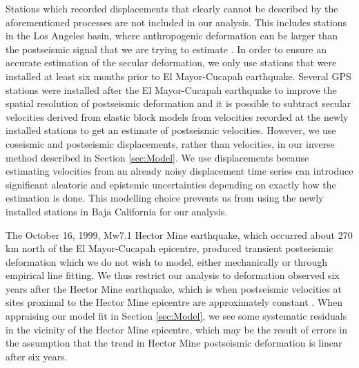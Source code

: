\documentclass[review]{elsarticle}
\begin{document}
Stations which recorded displacements that clearly cannot be described by the aforementioned processes are not included in our analysis. This includes stations in the Los Angeles basin, where anthropogenic deformation can be larger than the postseismic signal that we are trying to estimate \citep{Bawden2001,Argus2005} . In order to ensure an accurate estimation of the secular deformation, we only use stations that were installed at least six months prior to El Mayor-Cucapah earthquake. Several GPS stations were installed after the El Mayor-Cucapah earthquake to improve the spatial resolution of postseismic deformation \citep{Spinler2015} and it is possible to subtract secular velocities derived from elastic block models \citep[e.g.][]{Meade2005} from velocities recorded at the newly installed stations to get an estimate of postseismic velocities. However, we use coseismic and postseismic displacements, rather than velocities, in our inverse method described in Section \ref{sec:Model}. We use displacements because estimating velocities from an already noisy displacement time series can introduce significant aleatoric and epistemic uncertainties depending on exactly how the estimation is done. This modelling choice prevents us from using the newly installed stations in Baja California for our analysis.   

The October 16, 1999, Mw7.1 Hector Mine earthquake, which occurred about 270 km north of the El Mayor-Cucapah epicentre, produced transient postseismic deformation which we do not wish to model, either mechanically or through empirical line fitting.  We thus restrict our analysis to deformation observed six years after the Hector Mine earthquake, which is when postseismic velocities at sites proximal to the Hector Mine epicentre are approximately constant \citep{Savage2009}. When appraising our model fit in Section \ref{sec:Model}, we see some systematic residuals in the vicinity of the Hector Mine epicentre, which may be the result of errors in the assumption that the trend in Hector Mine postseismic deformation is linear after six years.   
\end{document}
